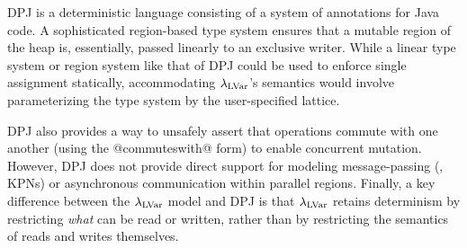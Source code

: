 DPJ \cite{dpj-hotpar09} is a deterministic language
consisting of a system of annotations for Java code.  A sophisticated
region-based type system ensures that a mutable region of the heap is,
essentially, passed linearly to an exclusive writer.
While a linear type system or region system like that of DPJ
could be used to enforce single assignment statically, accommodating $\lambda_{\textrm{LVar}}$'s
semantics would involve parameterizing the
type system by the user-specified lattice.

DPJ also
provides a way to unsafely assert that operations commute with one another (using the @commuteswith@ form) to enable
concurrent mutation.  However, DPJ does not provide direct support for
modeling message-passing (\eg, KPNs) or asynchronous communication
within parallel regions.  
Finally, a key difference between the $\lambda_{\textrm{LVar}}$ model and DPJ 
is that $\lambda_{\textrm{LVar}}$ retains determinism by restricting {\em
  what} can be read or written, rather than by restricting 
the semantics of reads and writes themselves.


%





